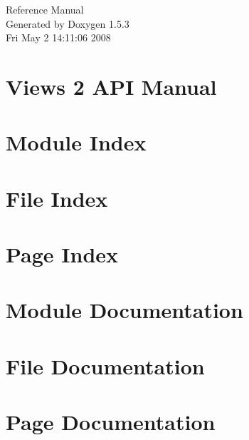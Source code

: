 \documentclass[a4paper]{book}
\begin{document}
\begin{titlepage}
\vspace*{7cm}
\begin{center}
{\Large Reference Manual}\\
\vspace*{1cm}
{\large Generated by Doxygen 1.5.3}\\
\vspace*{0.5cm}
{\small Fri May 2 14:11:06 2008}\\
\end{center}
\end{titlepage}
\clearemptydoublepage
{}
\tableofcontents
\clearemptydoublepage
{}
\chapter{Views 2 API Manual }
\label{index}
\chapter{Module Index}

\chapter{File Index}

\chapter{Page Index}

\chapter{Module Documentation}

\chapter{File Documentation}

\chapter{Page Documentation}



\printindex
\end{document}
